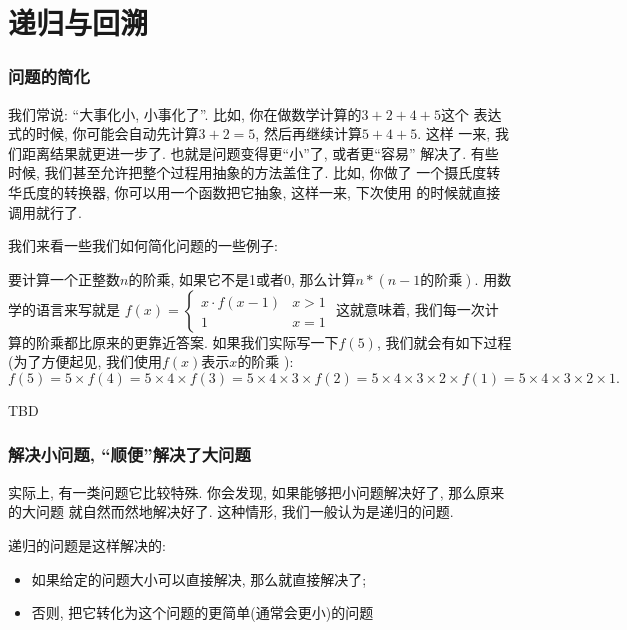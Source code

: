 \part{递归与回溯}

\section{问题的简化}

我们常说: ``大事化小, 小事化了''. 比如, 你在做数学计算的$3+2+4+5$这个
表达式的时候, 你可能会自动先计算$3+2=5$, 然后再继续计算$5+4+5$. 这样
一来, 我们距离结果就更进一步了. 也就是问题变得更``小''了, 或者更``容易''
解决了. 有些时候, 我们甚至允许把整个过程用抽象的方法盖住了. 比如, 你做了
一个摄氏度转华氏度的转换器, 你可以用一个函数把它抽象, 这样一来, 下次使用
的时候就直接调用就行了. 

我们来看一些我们如何简化问题的一些例子: 

\begin{example}
    要计算一个正整数$n$的阶乘, 如果它不是1或者0, 那么计算$n*(n-1\text{的阶乘})$.
    用数学的语言来写就是
    $f(x)=\begin{cases}
    x\cdot f(x-1) & x>1\\
    1 & x=1
    \end{cases}$
    这就意味着, 我们每一次计算的阶乘都比原来的更靠近答案. 如果我们实际写一下$f(5)$, 
    我们就会有如下过程(为了方便起见, 我们使用$f(x)$表示$x$的阶乘
    ): 
    $$
        f(5) = 5\times f(4) = 5\times 4\times f(3) = 5\times 4\times 3 \times f(2)
        = 5\times 4\times 3\times 2\times f(1) = 5\times 4\times 3\times 2\times 1.  
    $$
\end{example}

\begin{example}
    TBD %
\end{example}

\section{解决小问题, ``顺便''解决了大问题}

实际上, 有一类问题它比较特殊. 你会发现, 如果能够把小问题解决好了, 那么原来的大问题
就自然而然地解决好了. 这种情形, 我们一般认为是递归的问题. 

\begin{definition}
    递归的问题是这样解决的: 
    \begin{itemize}
        \item 如果给定的问题大小可以直接解决, 那么就直接解决了; 
        \item 否则, 把它转化为这个问题的更简单(通常会更小)的问题
    \end{itemize}
\end{definition}

